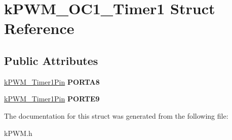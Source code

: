 \hypertarget{structkPWM__OC1__Timer1}{}\section{k\+P\+W\+M\+\_\+\+O\+C1\+\_\+\+Timer1 Struct Reference}
\label{structkPWM__OC1__Timer1}
\subsection*{Public Attributes}
\begin{DoxyCompactItemize}
\item 
\hyperlink{structkPWM__Timer1Pin}{k\+P\+W\+M\+\_\+\+Timer1\+Pin} {\bfseries P\+O\+R\+T\+A8}\hypertarget{structkPWM__OC1__Timer1_a43ddb1c63fb26dc810f42ba5eca2faa7}{}\label{structkPWM__OC1__Timer1_a43ddb1c63fb26dc810f42ba5eca2faa7}

\item 
\hyperlink{structkPWM__Timer1Pin}{k\+P\+W\+M\+\_\+\+Timer1\+Pin} {\bfseries P\+O\+R\+T\+E9}\hypertarget{structkPWM__OC1__Timer1_aff413886fff4fae9a92684f5bb0723a2}{}\label{structkPWM__OC1__Timer1_aff413886fff4fae9a92684f5bb0723a2}

\end{DoxyCompactItemize}


The documentation for this struct was generated from the following file\+:\begin{DoxyCompactItemize}
\item 
k\+P\+W\+M.\+h\end{DoxyCompactItemize}

